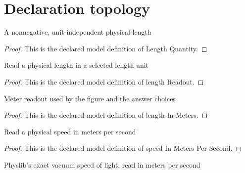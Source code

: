 \section{Declaration topology}
\begin{definition}
  \label{def:physics:phyx-mini-0509:phyxminiproblems-problemphyxmini0509-lengthquantity}
  A nonnegative, unit-independent physical length
\end{definition}
\begin{proof}
  This is the declared model definition of Length Quantity.
\end{proof}
\begin{definition}
  \label{def:physics:phyx-mini-0509:phyxminiproblems-problemphyxmini0509-lengthreadout}
  Read a physical length in a selected length unit
\end{definition}
\begin{proof}
  This is the declared model definition of length Readout.
\end{proof}
\begin{definition}
  \label{def:physics:phyx-mini-0509:phyxminiproblems-problemphyxmini0509-lengthinmeters}
  Meter readout used by the figure and the answer choices
\end{definition}
\begin{proof}
  This is the declared model definition of length In Meters.
\end{proof}
\begin{definition}
  \label{def:physics:phyx-mini-0509:phyxminiproblems-problemphyxmini0509-speedinmeterspersecond}
  Read a physical speed in meters per second
\end{definition}
\begin{proof}
  This is the declared model definition of speed In Meters Per Second.
\end{proof}
\begin{definition}
  \label{def:physics:phyx-mini-0509:phyxminiproblems-problemphyxmini0509-vacuumspeedoflightinmeterspersecond}
  Physlib's exact vacuum speed of light, read in meters per second
\end{definition}

